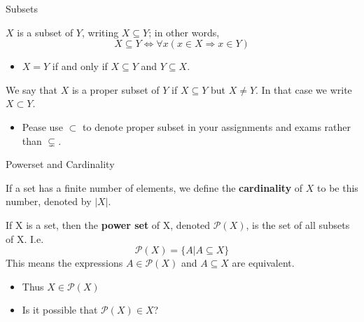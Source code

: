 \begin{frame}{Subsets}
    \begin{definition}
        $X$ is a subset of $Y$, writing $X\subseteq Y$; in other words, $$X\subseteq Y \Leftrightarrow \forall x(x \in X \Rightarrow x\in Y)$$
    \end{definition}
    \begin{itemize}
        \item  $X = Y$ if and only if $X \subseteq Y$ and $Y \subseteq X$.
    \end{itemize}
    \begin{definition}
        We say that $X$ is a proper subset of $Y$ if $X \subseteq Y$ but $X \neq Y$. In that case we write $X \subset Y$.
    \end{definition}
    \begin{itemize}
        \item Pease use $\subset$ to denote proper subset in your assignments and exams rather than $\subsetneq$.
    \end{itemize}
\end{frame}

\begin{frame}{Powerset and Cardinality}
    \begin{definition}
        If a set has a finite number of elements, we define the \textbf{cardinality} of $X$ to be this number, denoted by $|X|$.
    \end{definition}
    \begin{definition}
        If X is a set, then the \textbf{power set} of X, denoted $\mathscr{P}(X)$, is the set of all subsets of X. I.e. $$\mathscr{P}(X) = \{A | A \subseteq X\}$$
        This means the expressions $A \in \mathscr{P}(X)$ and $A \subseteq X$ are equivalent.
    \end{definition}
    \begin{itemize}
        \item Thus $X\in \mathscr{P}(X)$
        \item Is it possible that $\mathscr{P}(X)\in X$?
    \end{itemize}
\end{frame}

